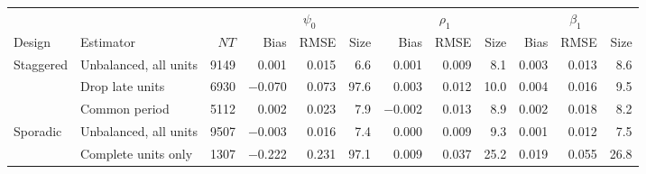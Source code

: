 \begin{tabular}{llrrrrrrrrrr}
\toprule
 & & & \multicolumn{3}{c}{$\psi_0$} & \multicolumn{3}{c}{$\rho_1$} & \multicolumn{3}{c}{$\beta_1$} \\
\cmidrule(lr){4-6}\cmidrule(lr){7-9}\cmidrule(lr){10-12}
Design & Estimator & $NT$ & Bias & RMSE & Size & Bias & RMSE & Size & Bias & RMSE & Size \\
\midrule
Staggered & Unbalanced, all units & 9149 & 0.001 & 0.015 & 6.6 & 0.001 & 0.009 & 8.1 & 0.003 & 0.013 & 8.6 \\
 & Drop late units & 6930 & $-$0.070 & 0.073 & 97.6 & 0.003 & 0.012 & 10.0 & 0.004 & 0.016 & 9.5 \\
 & Common period & 5112 & 0.002 & 0.023 & 7.9 & $-$0.002 & 0.013 & 8.9 & 0.002 & 0.018 & 8.2 \\
\addlinespace
Sporadic & Unbalanced, all units & 9507 & $-$0.003 & 0.016 & 7.4 & 0.000 & 0.009 & 9.3 & 0.001 & 0.012 & 7.5 \\
 & Complete units only & 1307 & $-$0.222 & 0.231 & 97.1 & 0.009 & 0.037 & 25.2 & 0.019 & 0.055 & 26.8 \\
\bottomrule
\end{tabular}
